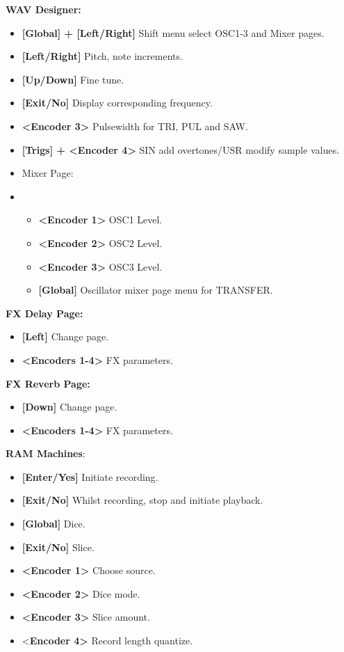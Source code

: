 \textbf{WAV Designer:} 
\begin{itemize}

     \item \textbf{[Global] + [Left/Right] }Shift menu select OSC1-3 and Mixer pages.
     \item \textbf{[Left/Right]} Pitch, note increments.
     \item \textbf{[Up/Down]} Fine tune.
     \item \textbf{[Exit/No] }Display corresponding frequency.
     \item \textbf{<Encoder 3>} Pulsewidth for TRI, PUL and SAW.
     \item \textbf{[Trigs] + <Encoder 4>} SIN add overtones/USR modify sample values.
     \item Mixer Page:
     \item \begin{itemize}
         \item \textbf{<Encoder 1>} OSC1 Level.
         \item \textbf{<Encoder 2>} OSC2 Level.
         \item \textbf{<Encoder 3>} OSC3 Level.
         \item \textbf{[Global]} Oscillator mixer page menu for TRANSFER.
     \end{itemize}
     \end{itemize}
     \textbf{FX Delay Page:} 
\begin{itemize}

     \item \textbf{[Left] }Change page.
     \item \textbf{<Encoders 1-4>} FX parameters.
     \end{itemize}
       \textbf{FX Reverb Page:} 
\begin{itemize}

     \item \textbf{[Down] }Change page.
     \item \textbf{<Encoders 1-4>} FX parameters.
     \end{itemize}
    \textbf{RAM Machines}:
\begin{itemize}

     \item \textbf{[Enter/Yes]} Initiate recording.
     \item \textbf{[Exit/No]} Whilst recording, stop and initiate playback.
     \item \textbf{[Global]} Dice.
     \item \textbf{[Exit/No]} Slice.
     \item \textbf{<Encoder 1>} Choose source.
     \item \textbf{<Encoder 2>} Dice mode.
     \item \textbf{<Encoder 3>} Slice amount.
     \item <\textbf{Encoder 4>} Record length quantize.
     \end{itemize}
   

\newpage

